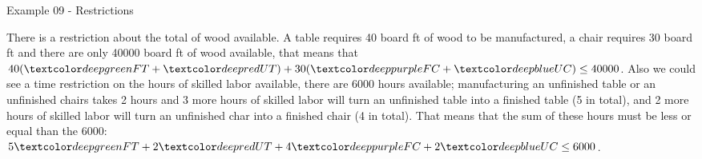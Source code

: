 \begin{frame}{Example 09 - Restrictions}

There is a restriction about the total of wood available. A table requires 40
board ft of wood to be manufactured, a chair requires 30 board ft and there are
only 40000 board ft of wood available, that means that
$40(\colorb{FT} + \colora{UT}) + 30(\colord{FC} + \colorc{UC}) \le 40000$.
Also we could see a time restriction on the hours of skilled labor available,
there are 6000 hours available; manufacturing an unfinished table or an
unfinished chairs takes 2 hours and 3 more hours of skilled labor will turn an
unfinished table into a finished table (5 in total), and 2 more hours of skilled
labor will turn an unfinished char into a finished chair (4 in total). That
means that the sum of these hours must be less or equal than the 6000:
$5\colorb{FT} + 2\colora{UT} + 4\colord{FC} + 2\colorc{UC} \le 6000$.

\end{frame}
